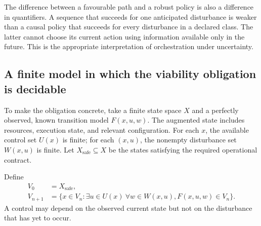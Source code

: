 \documentclass[11pt,a4paper]{article}
\theoremstyle{definition}
\theoremstyle{remark}
\begin{document}
The difference between a favourable path and a robust policy is also a difference in quantifiers. A sequence that succeeds for one anticipated disturbance is weaker than a causal policy that succeeds for every disturbance in a declared class. The latter cannot choose its current action using information available only in the future. This is the appropriate interpretation of orchestration under uncertainty.

\subsection{A finite model in which the viability obligation is decidable}
To make the obligation concrete, take a finite state space $X$ and a perfectly observed, known transition model $F(x,u,w)$. The augmented state includes resources, execution state, and relevant configuration. For each $x$, the available control set $U(x)$ is finite; for each $(x,u)$, the nonempty disturbance set $W(x,u)$ is finite. Let $X_{\mathrm{safe}}\subseteq X$ be the states satisfying the required operational contract.

Define
\begin{align}
 V_0&=X_{\mathrm{safe}},\label{eq:V0}\\
 V_{n+1}&=\{x\in V_n:\exists u\in U(x)\ \forall w\in W(x,u),
                       F(x,u,w)\in V_n\}.\label{eq:viability}
\end{align}
A control may depend on the observed current state but not on the disturbance that has yet to occur.
\end{document}

